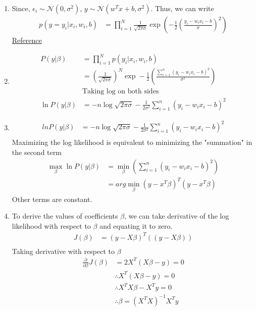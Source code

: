 \begin{enumerate}
	
	
	\item Since, $\epsilon_{i} \sim \mathcal{N}(0, \sigma^{2})$, $y \sim \mathcal{N}(w^{T}x + b,\sigma^{2})$. Thus, we can write 
		\begin{align*}
    		p(y = y_{i} | x_{i}, w_{i}, b) & = \prod_{i=1}^{N} \frac{1}{\sqrt{2\pi\sigma}} \exp 			\left( -\frac{1}{2} \left( \frac{y_{i} - w_{i}x_{i} - b}{\sigma} \right)^{2} \right) 
		\end{align*}
		\href{https://stats.stackexchange.com/questions/327427/how-is-y-normally-distributed-in-linear-regression}{Reference}
		
	\item 
		\begin{align*}
			P(y | \beta) & = \prod_{i=1}^{N} p(y_{i} | x_{i}, w_{i}, b) \\
	    	& = \left( \frac{1}{\sqrt{2\pi\sigma}} \right)^{N} \exp -\frac{1}{2} \left( \frac{\sum_{i=1}^{n}(y_{i} - w_{i}x_{i} - b)^{2}}{\sigma^{2}} \right) \\
    		& \text{Taking log on both sides} \\
			\ln P(y | \beta) & = -n \log \sqrt{2\pi\sigma} - \frac{1}{2\sigma^{2}} \sum_{i=1}^{n} (y_{i} - w_{i}x_{i} - b)^{2}	
		\end{align*}
	
	
	
	\item 
		\begin{align*}
			ln P(y | \beta) & = -n \log \sqrt{2\pi\sigma} - \frac{1}{2\sigma^{2}} \sum_{i=1}^{n} (y_{i} - w_{i}x_{i} - b)^{2} \\
		\end{align*}
		Maximizing the log likelihood is equivalent to minimizing the "summation" in the second term
		\begin{align*}
			\max_{\beta} \ln P(y | \beta) & = \min_{\beta}(\sum_{i=1}^{n} (y_{i} - w_{i}x_{i} - b)^{2}) \\
    		& = arg\min_{\beta}(y - x^{T}\beta)^{T}(y - x^{T}\beta)
		\end{align*}
		Other terms are constant.
	
	
	
	\item To derive the values of coefficients $\beta$, we can take derivative of the log likelihood with respect to $\beta$ and equating it to zero.
		\begin{align*}
			J(\beta) & = (y - X\beta)^{T}((y - X\beta)) \\			
		\end{align*}
		Taking derivative with respect to $\beta$
		\begin{align*}
			\frac{\partial}{\partial\beta} J(\beta) & = 2X^{T}(X\beta - y) = 0 \\
		    & \therefore X^{T}(X\beta - y) = 0 \\
		    & \therefore X^{T}X\beta - X^{T}y = 0 \\
		    & \therefore \beta = (X^{T}X)^{-1}X^{T}y
		\end{align*}
		    		
		
\end{enumerate}